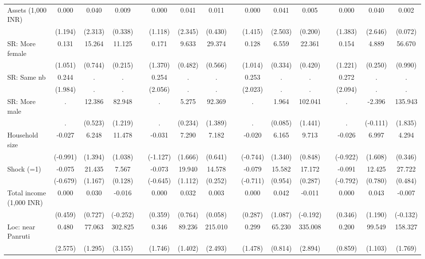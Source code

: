 {\begin{longtable}{@{\extracolsep{\fill}}lccccccccccccccc}
    Assets (1,000 INR) & 0.000 & 0.040 & 0.009 &   & 0.000 & 0.041 & 0.011 &   & 0.000 & 0.041 & 0.005 &   & 0.000 & 0.040 & 0.002 \\
      & (1.194) & (2.313) & (0.338) &   & (1.118) & (2.345) & (0.430) &   & (1.415) & (2.503) & (0.200) &   & (1.383) & (2.646) & (0.072) \\
    SR: More female & 0.131 & 15.264 & 11.125 &   & 0.171 & 9.633 & 29.374 &   & 0.128 & 6.559 & 22.361 &   & 0.154 & 4.889 & 56.670 \\
      & (1.051) & (0.744) & (0.215) &   & (1.370) & (0.482) & (0.566) &   & (1.014) & (0.334) & (0.420) &   & (1.221) & (0.250) & (0.990) \\
    SR: Same nb & 0.244 & . & . &   & 0.254 & . & . &   & 0.253 & . & . &   & 0.272 & . & . \\
      & (1.984) & . & . &   & (2.056) & . & . &   & (2.023) & . & . &   & (2.094) & . & . \\
    SR: More male & . & 12.386 & 82.948 &   & . & 5.275 & 92.369 &   & . & 1.964 & 102.041 &   & . & -2.396 & 135.943 \\
      & . & (0.523) & (1.219) &   & . & (0.234) & (1.389) &   & . & (0.085) & (1.441) &   & . & (-0.111) & (1.835) \\
    Household size & -0.027 & 6.248 & 11.478 &   & -0.031 & 7.290 & 7.182 &   & -0.020 & 6.165 & 9.713 &   & -0.026 & 6.997 & 4.294 \\
      & (-0.991) & (1.394) & (1.038) &   & (-1.127) & (1.666) & (0.641) &   & (-0.744) & (1.340) & (0.848) &   & (-0.922) & (1.608) & (0.346) \\
    Shock (=1) & -0.075 & 21.435 & 7.567 &   & -0.073 & 19.940 & 14.578 &   & -0.079 & 15.582 & 17.172 &   & -0.091 & 12.425 & 27.722 \\
      & (-0.679) & (1.167) & (0.128) &   & (-0.645) & (1.112) & (0.252) &   & (-0.711) & (0.954) & (0.287) &   & (-0.792) & (0.780) & (0.484) \\
    Total income (1,000 INR) & 0.000 & 0.030 & -0.016 &   & 0.000 & 0.032 & 0.003 &   & 0.000 & 0.042 & -0.011 &   & 0.000 & 0.043 & -0.007 \\
      & (0.459) & (0.727) & (-0.252) &   & (0.359) & (0.764) & (0.058) &   & (0.287) & (1.087) & (-0.192) &   & (0.346) & (1.190) & (-0.132) \\
    Loc: near Panruti & 0.480 & 77.063 & 302.825 &   & 0.346 & 89.236 & 215.010 &   & 0.299 & 65.230 & 335.008 &   & 0.200 & 99.549 & 158.327 \\
      & (2.575) & (1.295) & (3.155) &   & (1.746) & (1.402) & (2.493) &   & (1.478) & (0.814) & (2.894) &   & (0.859) & (1.103) & (1.769) \\

\end{longtable}}

